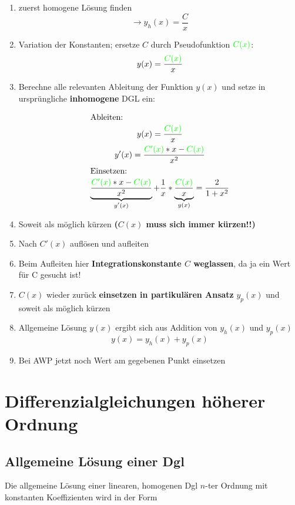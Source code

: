 \documentclass[12pt, a4paper]{scrreprt}
\begin{document}
\begin{enumerate}
\item zuerst homogene Lösung finden
  \[\rightarrow y_h(x)=\frac{C}{x}\]
\item Variation der Konstanten; ersetze \(C\) durch \glqq{}Pseudofunktion\grqq{} \(\textcolor{green}{C(x)}\):
  \[y(x)=\frac{\textcolor{green}{C(x)}}{x}\]
\item Berechne alle relevanten Ableitung der Funktion \(y(x)\) und setze in ursprüngliche \textbf{inhomogene} DGL ein:

  \begin{gather*}
    \intertext{Ableiten:}
    y(x)=\frac{\textcolor{green}{C(x)}}{x}\\
    y'(x)=\frac{\textcolor{green}{C'(x)}*x-\textcolor{green}{C(x)}}{x^2}\\
    \intertext{Einsetzen:}
    \underbrace{\frac{\textcolor{green}{C'(x)}*x-\textcolor{green}{C(x)}}{x^2}}_\text{\(y'(x)\)}+\frac{1}{x}*\underbrace{\frac{\textcolor{green}{C(x)}}{x}}_\text{\(y(x)\)}=\frac{2}{1+x^2}
  \end{gather*}

\item Soweit als möglich kürzen \textbf{(\(C(x)\) muss sich immer kürzen!!)}
\item Nach \(C'(x)\) auflösen und aufleiten
\item Beim Aufleiten hier \textbf{Integrationskonstante \(C\) weglassen}, da ja ein Wert für C gesucht ist!
\item \textbf{\(C(x)\)} wieder zurück \textbf{einsetzen in partikulären Ansatz} \(y_p(x)\) und soweit als möglich kürzen
\item Allgemeine Lösung \(y(x)\) ergibt sich aus Addition von \(y_h(x)\) und \(y_p(x)\)
  \[y(x)=y_h(x)+y_p(x)\]
\item Bei AWP jetzt noch Wert am gegebenen Punkt einsetzen
  
\end{enumerate}
\section{Differenzialgleichungen höherer Ordnung}

\subsection{Allgemeine Lösung einer Dgl}

Die allgemeine Lösung einer linearen, homogenen Dgl \(n\)-ter Ordnung mit konstanten Koeffizienten wird in der Form
\end{document}
